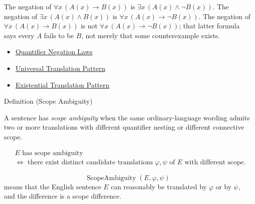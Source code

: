 \begin{remark*}[Exposition]
The negation of \(\forall x\,(A(x)\to B(x))\) is
\(\exists x\,(A(x)\land \neg B(x))\). The negation of
\(\exists x\,(A(x)\land B(x))\) is \(\forall x\,(A(x)\to \neg B(x))\). The
negation of \(\forall x\,(A(x)\to B(x))\) is not
\(\forall x\,(A(x)\to \neg B(x))\); that latter formula says every \(A\) fails
to be \(B\), not merely that some counterexample exists.
\end{remark*}

\begin{dependencies}
\begin{itemize}
  \item \hyperref[thm:qneg]{Quantifier Negation Laws}
  \item \hyperref[prop:universal-translation-pattern]{Universal Translation Pattern}
  \item \hyperref[prop:existential-translation-pattern]{Existential Translation Pattern}
\end{itemize}
\end{dependencies}

\begin{definitionbox}{Definition (Scope Ambiguity)}
\begin{definition}
\label{def:scope-ambiguity-translation}
A sentence has \emph{scope ambiguity} when the same ordinary-language wording
admits two or more translations with different quantifier nesting or different
connective scope.
\end{definition}
\end{definitionbox}

\begin{remark*}
\[
\begin{aligned}
&E \text{ has scope ambiguity}\\
&\Longleftrightarrow
\text{ there exist distinct candidate translations }\varphi,\psi
\text{ of }E\text{ with different scope.}
\end{aligned}
\]
\end{remark*}

\begin{remark*}
\[
  \operatorname{ScopeAmbiguity}(E,\varphi,\psi)
\] means that the English
sentence \(E\) can reasonably be translated by \(\varphi\) or by \(\psi\), and
the difference is a scope difference.
\end{remark*}

